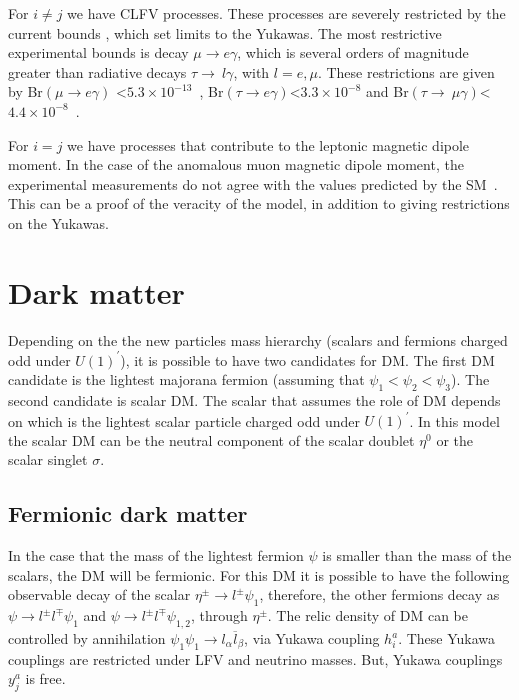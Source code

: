 \documentclass[12pt]{article}
\begin{document}
For $i \neq j$ we have CLFV processes. These processes are severely restricted by the current bounds , which set limits to the Yukawas. The most restrictive experimental bounds is decay $\mu \to e \gamma$, which is several orders of magnitude greater than radiative decays $\tau \to~l\gamma$, with $l = e, \mu$. These restrictions are given by Br$(\mu \to e\gamma)$ \textless $5.3 \times 10^{-13} $~\cite{Adam:2013mnn}, Br$(\tau \to e\gamma) $\textless$ 3.3 \times 10^{-8}$ and Br$(\tau \to~\mu\gamma) $\textless$ 4.4 \times 10^{-8}$~\cite{Aubert:2009ag, Bona:2007qt, Miyazaki:2012mx}. 

For $i = j$ we have processes that contribute to the leptonic magnetic dipole moment. In the case of the anomalous muon magnetic dipole moment, the experimental measurements do not agree with the values predicted by the SM~\cite{Lindner:2016bgg}. This can be a proof of the veracity of the model, in addition to giving restrictions on the Yukawas.

\section{Dark matter}
\label{sec:DM}
Depending on the the new particles mass hierarchy (scalars and fermions charged odd under $U(1)^{\prime}$), it is possible to have two candidates for DM. The first DM candidate is the lightest majorana fermion (assuming that $\psi_{1} < \psi_{2} < \psi_{3}$). The second candidate is scalar DM. The scalar that assumes the role of DM depends on which is the lightest scalar particle charged odd under $U(1)^{\prime}$. In this model the scalar DM can be the neutral component of the scalar doublet $\eta^{0}$ or the scalar singlet $\sigma$.

\subsection{Fermionic dark matter}
In the case that the mass of the lightest fermion $\psi$ is smaller than the mass of the scalars, the DM will be fermionic. For this DM it is possible to have the following observable decay of the scalar $\eta^{\pm} \to l^{\pm} \psi_{1}$, therefore, the other fermions decay as $ \psi \to l^{\pm} l^{\mp} \psi_{1}$ and $\psi \to l^{\pm} l^{\mp} \psi_{1,2} $, through $\eta^{\pm}$. The relic density of DM can be controlled by annihilation $\psi_{1} \psi_{1} \to l _{\alpha} \overline{l}_{\beta} $, via Yukawa coupling $h^{a}_{i}$. These Yukawa couplings are restricted under LFV and neutrino masses. But, Yukawa couplings $y^{a}_{j}$ is free.
\end{document}
